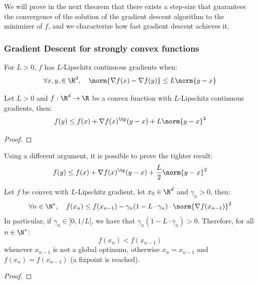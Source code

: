 \documentclass{../cs-classes/cs-classes}
\begin{document}
We will prove in the next theorem that there exists a step-size that guarantees the convergence of the solution of the gradient descent algorithm to the minimizer of $f$, and we characterize how fast gradient descent achieves it.

\subsubsection{Gradient Descent for strongly convex functions}
\begin{definition}
    For $L>0$, $f$ has $L$-Lipschitz continuous gradients when:
    \begin{equation*}
        \forall x, y, \in\R^d, \quad \norm{\nabla f(x) - \nabla f(y)}\leq L\norm{y-x}
    \end{equation*}
\end{definition}

\begin{lemma}
    Let $L>0$ and $f:\R^d\to\R$ be a convex function with $L$-Lipschitz continuous gradients, then:
    \begin{equation}
        f(y)\leq f(x)+\nabla f(x)^\tp(y-x)+L\norm{y-x}^2
    \end{equation}
\end{lemma}
\begin{proof}
\end{proof}

\begin{remark}
    Using a different argument, it is possible to prove the tighter result:
    \begin{equation*}
        f(y)\leq f(x)+\nabla f(x)^\tp(y-x)+\frac{L}{2}\norm{y-x}^2
    \end{equation*}
\end{remark}

\begin{lemma}
    Let $f$ be convex with $L$-Lipschitz gradient, let $x_0\in\R^d$ and $\gamma_n>0$, then:
    \begin{equation*}
        \forall n\in\N^*, \quad f(x_n)\leq f(x_{n-1}) - \gamma_n(1-L\cdot\gamma_n) \cdot \norm{\nabla f(x_{n-1})}^2
    \end{equation*}
    In particular, if $\gamma_n\in\rbrack 0, 1/L\lbrack$, we have that $\gamma_n(1-L\cdot\gamma_n)>0$. Therefore, for all $n\in\N^*$:
    \begin{equation*}
        f(x_n)<f(x_{n-1})
    \end{equation*}
    whenever $x_{n-1}$ is not a global optimum, otherwise $x_n=x_{n-1}$ and $f(x_n)=f(x_{n-1})$ (a fixpoint is reached).
\end{lemma}
\begin{proof}
    
\end{proof}
\end{document}
